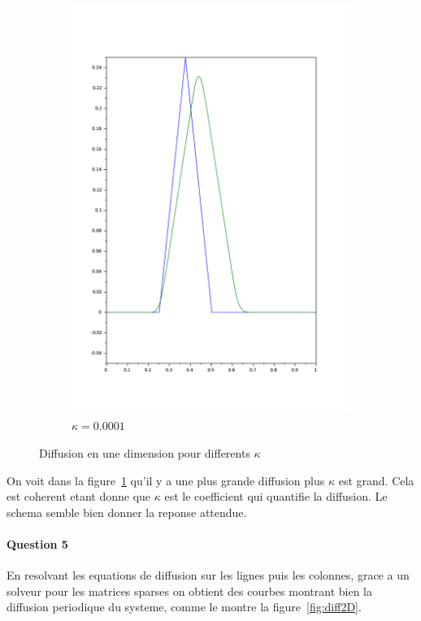 \documentclass{article}
\begin{document}
\begin{figure}
\begin{subfigure}[b]{0.3\textwidth}
		\includegraphics[width=\textwidth]{conv_kappa_0,0001.pdf}
		\caption{$\kappa=0.0001$}
	\end{subfigure}
	\caption{Diffusion en une dimension pour differents $\kappa$}\label{fig:diff1D}
\end{figure}

On voit dans la figure~\ref{fig:diff1D} qu'il y a une plus grande diffusion plus $\kappa$ est grand. Cela est coherent etant donne que $\kappa$ est le coefficient qui quantifie la diffusion. Le schema semble bien donner la reponse attendue.

\paragraph{Question 5}

En resolvant les equations de diffusion sur les lignes puis les colonnes, grace a un solveur pour les matrices sparses on obtient des courbes montrant bien la diffusion periodique du systeme, comme le montre la figure~\ref{fig:diff2D}.
\end{document}
